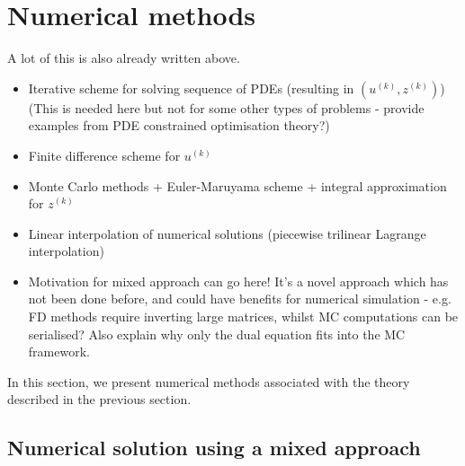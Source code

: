 \section{Numerical methods}
A lot of this is also already written above.
\begin{itemize}
    \item Iterative scheme for solving sequence of PDEs (resulting in $(u^{(k)},z^{(k)})$) (This is needed here but not for some other types of problems - provide examples from PDE constrained optimisation theory?)
    \item Finite difference scheme for $u^{(k)}$
    \item Monte Carlo methods + Euler-Maruyama scheme + integral approximation for $z^{(k)}$
    \item Linear interpolation of numerical solutions (piecewise trilinear Lagrange interpolation)
    \item Motivation for mixed approach can go here! It's a novel approach which has not been done before, and could have benefits for numerical simulation - e.g. FD methods require inverting large matrices, whilst MC computations can be serialised? Also explain why only the dual equation fits into the MC framework.
\end{itemize}

In this section, we present numerical methods associated with the theory described in the previous section. 

\subsection{Numerical solution using a mixed approach}







